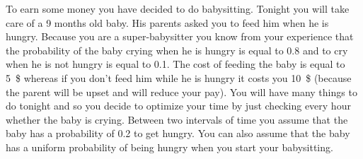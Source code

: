 \documentclass[11pt, a4paper]{article}
\begin{document}
To earn some money you have decided to do babysitting. Tonight you will take care of a 9 months old baby. His parents asked you to feed him when he is hungry. Because you are a super-babysitter you know from your experience that the probability of the baby crying when he is hungry is equal to 0.8 and to cry when he is not hungry is equal to 0.1. The cost of feeding the baby is equal to \qty{5}{\$} whereas if you don't feed him while he is hungry it costs you \qty{10}{\$} (because the parent will be upset and will reduce your pay). You will have many things to do tonight and so you decide to optimize your time by just checking every hour whether the baby is crying. Between two intervals of time you assume that the baby has a probability of 0.2 to get hungry. You can also assume that the baby has a uniform probability of being hungry when you start your babysitting.
\end{document}
